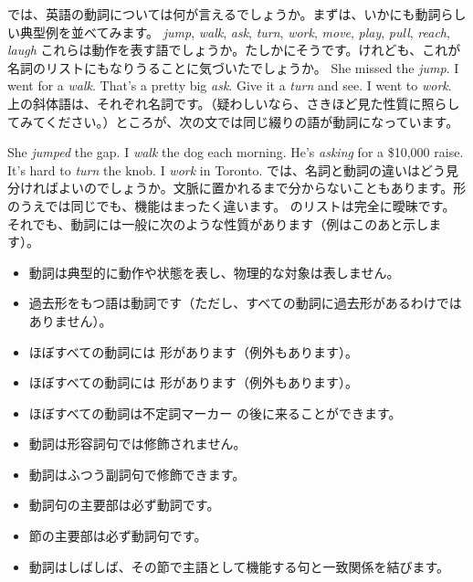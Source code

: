 では、英語の動詞については何が言えるでしょうか。まずは、いかにも動詞らしい典型例を並べてみます。
\ea
    \emph{jump}, \emph{walk}, \emph{ask}, \emph{turn}, \emph{work}, \emph{move}, \emph{play}, \emph{pull}, \emph{reach}, \emph{laugh} \label{ex:verblist}
\z
{}これらは動作を表す語でしょうか。たしかにそうです。けれども、これが名詞のリストにもなりうることに気づいたでしょうか。
\ea\label{ex:verb-list-as-nouns}
    \ea She missed the \emph{jump}.
    \ex I went for a \emph{walk}.
    \ex That's a pretty big \emph{ask}.
    \ex Give it a \emph{turn} and see.
    \ex I went to \emph{work}.
\z
\z
上の斜体語は、それぞれ名詞です。（疑わしいなら、さきほど見た性質に照らしてみてください。）ところが、次の文では同じ綴りの語が動詞になっています。

\ea\label{ex:verb-list-as-verbs}
    \ea She \emph{jumped} the gap.
    \ex I \emph{walk} the dog each morning.
    \ex He's \emph{asking} for a \$10,000 raise.
    \ex It's hard to \emph{turn} the knob.
    \ex I \emph{work} in Toronto.
\z
\z
では、名詞と動詞の違いはどう見分ければよいのでしょうか。文脈に置かれるまで分からないこともあります。形のうえでは同じでも、機能はまったく違います。 のリストは完全に曖昧です。 それでも、動詞には一般に次のような性質があります（例はこのあと示します）。

\begin{itemize}[noitemsep]
    \item {}動詞は典型的に動作や状態を表し、物理的な対象は表しません。
    \item {}過去形をもつ語は動詞です（ただし、すべての動詞に過去形があるわけではありません）。
    \item ほぼすべての動詞には  形があります（例外もあります）。
    \item ほぼすべての動詞には  形があります（例外もあります）。
    \item ほぼすべての動詞は不定詞マーカー  の後に来ることができます。
    \item 動詞は形容詞句では修飾されません。
    \item {}動詞はふつう副詞句で修飾できます。
    \item 動詞句の主要部は必ず動詞です。
    \item {}節の主要部は必ず動詞句です。
    \item {}動詞はしばしば、その節で主語として機能する句と一致関係を結びます。
\end{itemize}

